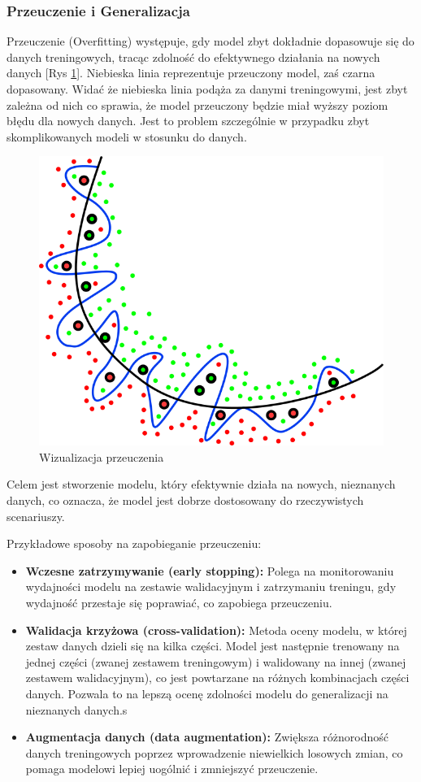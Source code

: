 \subsubsection*{Przeuczenie i Generalizacja}

Przeuczenie (Overfitting) występuje, gdy model zbyt dokładnie dopasowuje się do danych treningowych, tracąc zdolność do efektywnego działania na nowych danych [Rys \ref{fig:image17}]. Niebieska linia reprezentuje przeuczony model, zaś czarna dopasowany. Widać że niebieska linia podąża za danymi treningowymi, jest zbyt zależna od nich co sprawia, że model przeuczony będzie miał wyższy poziom błędu dla nowych danych. Jest to problem szczególnie w przypadku zbyt skomplikowanych modeli w stosunku do danych.
\begin{figure}[h]
    \centering
    \includegraphics[width=0.4\linewidth]{Rozdziały/02.Podstawy_teoretyczne/Obrazy/overfitting.png}
    \caption{Wizualizacja przeuczenia}
    \label{fig:image17}
\end{figure}

Celem jest stworzenie modelu, który efektywnie działa na nowych, nieznanych danych, co oznacza, że model jest dobrze dostosowany do rzeczywistych scenariuszy.

Przykładowe sposoby na zapobieganie przeuczeniu:

\begin{itemize}
    \item \textbf{Wczesne zatrzymywanie (early stopping):} Polega na monitorowaniu wydajności modelu na zestawie walidacyjnym i zatrzymaniu treningu, gdy wydajność przestaje się poprawiać, co zapobiega przeuczeniu.
    \item \textbf{Walidacja krzyżowa (cross-validation):} Metoda oceny modelu, w której zestaw danych dzieli się na kilka części. Model jest następnie trenowany na jednej części (zwanej zestawem treningowym) i walidowany na innej (zwanej zestawem walidacyjnym), co jest powtarzane na różnych kombinacjach części danych. Pozwala to na lepszą ocenę zdolności modelu do generalizacji na nieznanych danych.s
    \item \textbf{Augmentacja danych (data augmentation):} Zwiększa różnorodność danych treningowych poprzez wprowadzenie niewielkich losowych zmian, co pomaga modelowi lepiej uogólnić i zmniejszyć przeuczenie.
\end{itemize}


